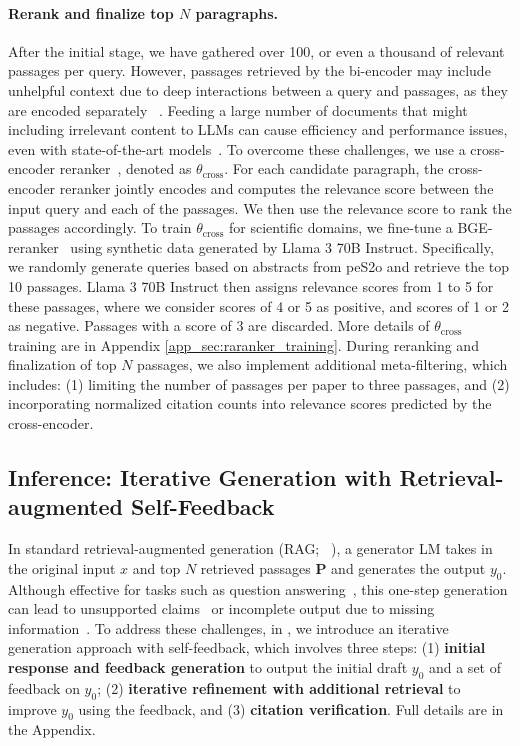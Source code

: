 \paragraph{Rerank and finalize top $N$ paragraphs.} 
After the initial stage, we have gathered over 100, or even a thousand of relevant passages per query. However, passages retrieved by the bi-encoder may include unhelpful context due to deep interactions between a query and passages, as they are encoded separately ~\citep{asai-etal-2023-task}. 
Feeding a large number of documents that might including irrelevant content to LLMs can cause efficiency and performance issues, even with state-of-the-art models~\citep{liu2023lost,xu2023recomp}. 
To overcome these challenges, we use a cross-encoder reranker~\citep{nogueira2019passage,bge_embedding}, denoted as $\theta_\text{cross}$. For each candidate paragraph, the cross-encoder reranker jointly encodes and computes the relevance score between the input query and each of the passages. We then use the relevance score to rank the passages accordingly. 
To train $\theta_\text{cross}$ for scientific domains, we fine-tune a BGE-reranker~\citep{bge_embedding} using synthetic data generated by Llama 3 70B Instruct. Specifically, we randomly generate queries based on abstracts from peS2o and retrieve the top 10 passages. Llama 3 70B Instruct then assigns relevance scores from 1 to 5 for these passages, where we consider scores of 4 or 5 as positive, and scores of 1 or 2 as negative. Passages with a score of 3 are discarded. 
More details of $\theta_\text{cross}$ training are in Appendix \ref{app_sec:raranker_training}. 
During reranking and finalization of top $N$ passages, we also implement additional meta-filtering, which includes: (1) limiting the number of passages per paper to three passages, and (2) incorporating normalized citation counts into relevance scores predicted by the cross-encoder. 

\subsection{Inference: Iterative Generation with Retrieval-augmented Self-Feedback}
\label{subsec:inference_algorithm}

In standard retrieval-augmented generation (RAG; ~\citealt{lewis2020retrieval,ram2023context}), a generator LM takes in the original input $x$ and top $N$ retrieved passages $\mathbf{P}$ and generates the output $y_0$. Although effective for tasks such as question answering~\citep{mallen2022not}, this one-step generation can lead to unsupported claims~\citep{liu2023evaluating} or incomplete output due to missing information~\citep{asai2024selfrag,jiang2023active}.  
To address these challenges, in \model, we introduce an iterative generation approach with self-feedback, which involves three steps: (1) {\bf initial response and feedback generation} to output the initial draft $y_0$ and a set of feedback on $y_0$; (2) {\bf iterative refinement with additional retrieval} to improve $y_0$ using the feedback, and (3) {\bf citation verification}. Full details are in the Appendix. 

